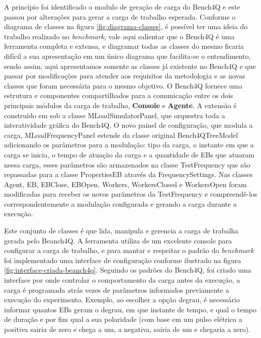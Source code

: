 A princípio foi identificado o modulo de geração de carga do Bench4Q e este passou por alterações para gerar a carga de trabalho esperada. Conforme o diagrama de classes na figura \ref{fig:diagrama-classes}, é possível ter uma ideia do trabalho realizado no \textit{benchmark}, vale aqui salientar que o Bench4Q é uma ferramenta completa e extensa, e diagramar todas as classes do mesmo ficaria difícil a sua apresentação em um único diagrama que facilita-se o entendimento, sendo assim, aqui apresentamos somente as classes já existente no Bench4Q e que passar por modificações para atender aos requisitos da metodologia e as novas classes que foram necessária para o mesmo objetivo.
O Bench4Q fornece uma estrutura e componentes compartilhados para a comunicação entre os dois principais módulos da carga de trabalho, \textbf{Console} e \textbf{Agente}. A extensão é construído em sob a classe \textsf{MLoadSimulatorPanel}, que orquestra toda a interatividade gráfica do Bench4Q. O novo painel de configuração, que modula a carga, \textsf{MLoadFrequencyPanel} estende da classe original \textsf{Bench4QTreeModel} adicionando os parâmetros para a modulação: tipo da carga, o instante em que a carga se inicia, o tempo de atuação da carga e a quantidade de EBs que atuaram nessa carga, esses parâmetros são armazenados na classe \textsf{TestFrequency} que são repassadas para a classe \textsf{PropertiesEB} através da \textsf{FrequencySettings}. Nas classes \textsf{Agent}, \textsf{EB}, \textsf{EBClose}, \textsf{EBOpen}, \textsf{Workers}, \textsf{WorkersClosed} e \textsf{WorkersOpen} foram modificadas para receber os novos parâmetros da \textsf{TestFrequency} e compreendê-los correspondentemente a modulação configurada e gerando a carga durante a execução.

Este conjunto de classes é que lida, manipula e gerencia a carga de trabalha gerada pelo Beanch4Q. A ferramenta utiliza de um excelente console para configurar a carga de trabalho, e para mantar e respeitar o padrão do \textit{benchmark} foi implementado uma interface de configuração conforme ilustrado na figura \ref{fig:interface-criada-beanch4q}. Seguindo os padrões do Bench4Q, foi criado uma interface por onde controlar o comportamento da carga antes da execução, a carga é programada atrás vezes de parâmetros informados previamente a execução do experimento. Exemplo, ao escolher a opção degrau, é necessário informar quantos EBs geram o degrau, em que instante de tempo, e qual o tempo de duração e por fim qual a sua polaridade (com base em um pulso elétrico a positiva sairia de zero e chega a um, a negativa, sairia de um e chegaria a zero).

